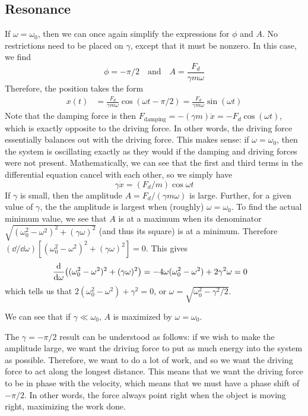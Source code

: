 \subsection*{Resonance}
If $\omega=\omega_0$, then we can once again simplify the expressions for $\phi$ and $A$. No restrictions need to be placed on $\gamma$, except that it must be nonzero. In this case, we find
\[ \phi = -\pi/2 \quad\text{and}\quad A= \frac{F_d}{\gamma m\omega}\]
Therefore, the position takes the form
\begin{align*}
    x(t) &= \frac{F_d}{\gamma m\omega}\cos(\omega t-\pi/2) = \frac{F_d}{\gamma m\omega}\sin(\omega t)
\end{align*}
Note that the damping force is then $F_\text{damping} = -(\gamma m)\dot x = -F_d\cos(\omega t)$, which is exactly opposite to the driving force. In other words, the driving force essentially balances out with the driving force. This makes sense: if $\omega=\omega_0$, then the system is oscillating exactly as they would if the damping and driving forces were not present. Mathematically, we can see that the first and third terms in the differential equation cancel with each other, so we simply have
\[ \gamma \dot x = (F_d/m)\cos\omega t\]
If $\gamma$ is small, then the amplitude $A = F_d/(\gamma m\omega)$ is large. Further, for a given value of $\gamma$, the the amplitude is largest when (roughly) $\omega = \omega_0$. To find the actual minimum value, we see that $A$ is at a maximum when its denominator $\sqrt{(\omega_0^2-\omega^2)^2 + (\gamma \omega)^2}$ (and thus its square) is at a minimum. Therefore $(\dd/\dd \omega)[(\omega_0^2-\omega^2)^2+(\gamma\omega)^2] = 0$. This gives
\begin{align*}
    \dv{\omega}\pqty{(\omega_0^2-\omega^2)^2 + (\gamma\omega)^2} &= -4\omega(\omega_0^2-\omega^2) + 2\gamma^2\omega = 0
\end{align*}
which tells us that $2(\omega_0^2-\omega^2) + \gamma^2 =0$, or $\omega = \sqrt{\omega_0^2-\gamma^2/2}$.

We can see that if $\gamma\ll \omega_0$, $A$ is maximized by $\omega = \omega_0$. 

The $\gamma = -\pi/2$ result can be understood as follows: if we wish to make the amplitude large, we want the driving force to put as much energy into the system as possible. Therefore, we want to do a lot of work, and so we want the driving force to act along the longest distance. This means that we want the driving force to be in phase with the velocity, which means that we must have a phase shift of $-\pi/2$. In other words, the force always point right when the object is moving right, maximizing the work done.
